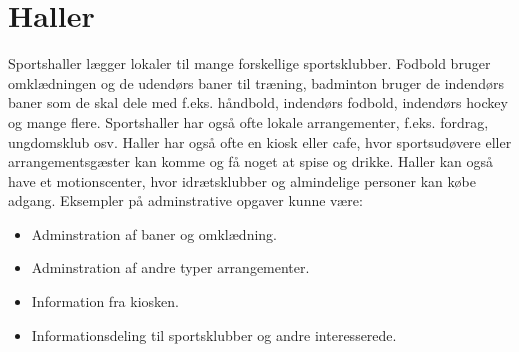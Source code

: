 \section{Haller}
Sportshaller lægger lokaler til mange forskellige sportsklubber. Fodbold bruger omklædningen og de udendørs baner til træning, badminton bruger de indendørs baner som de skal dele med f.eks. håndbold, indendørs fodbold, indendørs hockey og mange flere. Sportshaller har også ofte lokale arrangementer, f.eks. fordrag, ungdomsklub osv. 
Haller har også ofte en kiosk eller cafe, hvor sportsudøvere eller arrangementsgæster kan komme og få noget at spise og drikke. 
Haller kan også have et motionscenter, hvor idrætsklubber og almindelige personer kan købe adgang. 
Eksempler på adminstrative opgaver kunne være:
\begin{itemize}
\item Adminstration af baner og omklædning.
\item Adminstration af andre typer arrangementer.
\item Information fra kiosken.
\item Informationsdeling til sportsklubber og andre interesserede.
\end{itemize}
